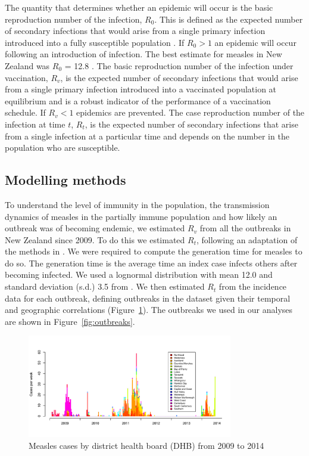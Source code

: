 \documentclass{article}
\begin{document}
{The quantity that determines whether an epidemic will occur is the basic reproduction number of the infection, $R_0$. This is defined as the expected number of secondary infections that would arise from a single primary infection introduced into a fully susceptible population \citep{anderson91, diekmann0}. If $R_0 > 1$ an epidemic will occur following an introduction of infection. The best estimate for measles in New Zealand was $R_0$ = 12.8 \citep{roberts4}. The basic reproduction number of the infection under vaccination, $R_v$, is the expected number of secondary infections that would arise from a single primary infection introduced into a vaccinated population at equilibrium and is a robust indicator of the performance of a vaccination schedule. If $R_v < 1$ epidemics are prevented. The case reproduction number of the infection at time $t$, $R_t$, is the expected number of secondary infections that arise from a single infection at a particular time and depends on the number in the population who are susceptible.

\subsection{Modelling methods}

To understand the level of immunity in the population, the transmission dynamics of measles in the partially immune population and how likely an outbreak was of becoming endemic, we estimated $R_v$ from all the outbreaks in New Zealand since 2009. To do this we estimated $R_t$, following an adaptation of the methods in \citep{obidia12,wallinga4}. We were required to compute the generation time for measles to do so. The generation time is the average time an index case infects others after becoming infected. We used a lognormal distribution with mean 12.0 and standard deviation (s.d.) 3.5 from \citep{klinkenberg11}. We then estimated $R_t$ from the incidence data for each outbreak, defining outbreaks in the dataset given their temporal and geographic correlations (Figure~\ref{fig:dhbcases}). The outbreaks we used in our analyses are shown in Figure~\ref{fig:outbreaks}.

\begin{figure}
     \centering
     \includegraphics[width=0.8\textwidth]{cases_by_dhb_2009_2014.pdf}
     \caption{Measles cases by district health board (DHB) from 2009 to 2014}
     \label{fig:dhbcases}
\end{figure}

}
\end{document}
